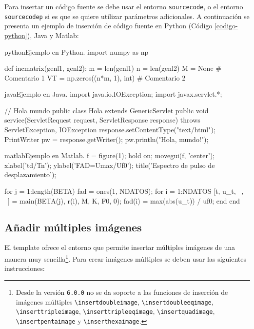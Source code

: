 		Para insertar un código fuente se debe usar el entorno \texttt{sourcecode}, o el entorno \texttt{sourcecodep} si es que se quiere utilizar parámetros adicionales. A continuación se presenta un ejemplo de inserción de código fuente en Python (Código \ref{codigo-python}), Java y Matlab:

\begin{sourcecode}[\label{codigo-python}]{python}{Ejemplo en Python.}
import numpy as np

def incmatrix(genl1, genl2):
	m = len(genl1)
	n = len(genl2)
	M = None # Comentario 1
	VT = np.zeros((n*m, 1), int) # Comentario 2
\end{sourcecode}

\begin{sourcecode}[]{java}{Ejemplo en Java.}
import java.io.IOException;
import javax.servlet.*;

// Hola mundo
public class Hola extends GenericServlet {
	public void service(ServletRequest request, ServletResponse response)
	throws ServletException, IOException{
		response.setContentType("text/html");
		PrintWriter pw = response.getWriter();
		pw.println("Hola, mundo!");
	}
}
\end{sourcecode}

\begin{sourcecode}{matlab}{Ejemplo en Matlab.}
f = figure(1); hold on; movegui(f, 'center');
xlabel('td/Tn'); ylabel('FAD=Umax/Uf0');
title('Espectro de pulso de desplazamiento');

for j = 1:length(BETA)
	fad = ones(1, NDATOS); %
	for i = 1:NDATOS
		[t, u_t, ~, ~] = main(BETA(j), r(i), M, K, F0, 0);
		fad(i) = max(abs(u_t)) / uf0;
	end
end
\end{sourcecode}

	\subsection{Añadir múltiples imágenes}

	El template ofrece el entorno \href{https://latex.ppizarror.com/informe.html#hlp-images}{} que permite insertar múltiples imágenes de una manera muy sencilla\footnote{Desde la versión \texttt{6.0.0} no se da soporte a las funciones de inserción de imágenes múltiples \texttt{\textbackslash insertdoubleimage}, \texttt{\textbackslash insertdoubleeqimage}, \texttt{\textbackslash inserttripleimage}, \texttt{\textbackslash inserttripleeqimage}, \texttt{\textbackslash insertquadimage}, \texttt{\textbackslash insertpentaimage} y \texttt{\textbackslash inserthexaimage}.}. Para crear imágenes múltiples se deben usar las siguientes instrucciones:

